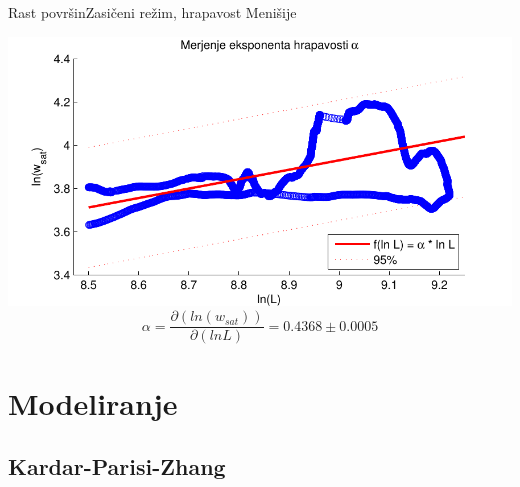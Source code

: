\documentclass{beamer}
\begin{document}
\begin{frame}{Rast površin}{Zasičeni režim, hrapavost Menišije}
\begin{center}
  \footnotesize
  \hspace*{-0.04\textwidth}\includegraphics[width=1.1\textwidth]{slike/menisija-alfa}
  \begin{equation} \alpha = \frac{\partial ( ln (w_{sat}) ) }{\partial ( ln L )} =  0.4368 \pm 0.0005 \end{equation}
\end{center}
\end{frame}


\section{Modeliranje}

\subsection{Kardar-Parisi-Zhang}
\end{document}
